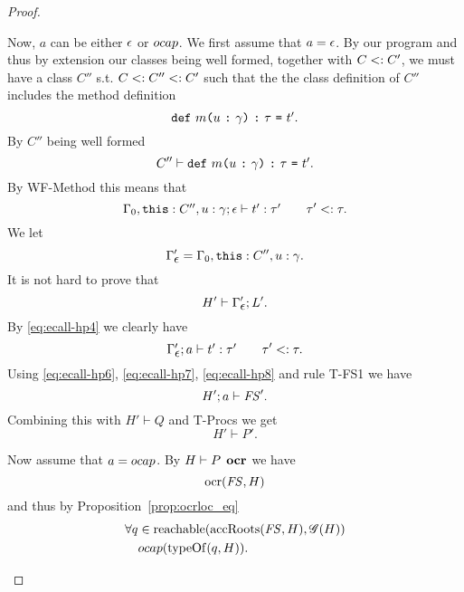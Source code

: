 \begin{proof}
\begin{description}
\begin{description}
          Now, $a$ can be either $\mbox{$\epsilon$}$ or $\mbox{$ocap$}$. We first assume that $a =
          \mbox{$\epsilon$}$.
          By our program and thus by extension our classes being well formed, together
          with $C <: C'$, we must have a class $C''$ s.t. $C <: C'' <:
          C'$ such that the the class definition of $C''$ includes the method
          definition
          \begin{equation*}
            \mbox{\mdseries\texttt{def}~$m$\texttt{(}$u$~\texttt{:}~$\gamma$\texttt{)}~\texttt{:}~$\tau$~\texttt{=}~$t'$}.
          \end{equation*}
          By $C''$ being well formed
          \begin{equation}
            C'' \vdash \mbox{\mdseries\texttt{def}~$m$\texttt{(}$u$~\texttt{:}~$\gamma$\texttt{)}~\texttt{:}~$\tau$~\texttt{=}~$t'$}.
          \end{equation}
          By {\sc WF-Method} this means that
          \begin{equation} \label{eq:ecall-hp4}
            \mbox{$\Gamma_0,\mbox{\mdseries\texttt{this}}: C'', u: \gamma;\mbox{$\epsilon$}\vdash t':\tau'$}
            \quad\quad \tau' <: \tau.
          \end{equation}
          We let
          \begin{equation}
            \Gamma_{\mbox{$\epsilon$}}' = \Gamma_0, \mbox{\mdseries\texttt{this}}: C'', u: \gamma.
          \end{equation}
          It is not hard to prove that 
          \begin{equation} \label{eq:ecall-hp7}
            H' \vdash \Gamma_{\mbox{$\epsilon$}}'; L'.
          \end{equation}
          By \eqref{eq:ecall-hp4} we clearly have
          \begin{equation} \label{eq:ecall-hp8}
            \mbox{$\Gamma_{\mbox{$\epsilon$}}';a\vdash t':\tau'$} \quad\quad \tau' <: \tau.
          \end{equation}
          Using  \eqref{eq:ecall-hp6}, \eqref{eq:ecall-hp7},
          \eqref{eq:ecall-hp8} and rule {\sc T-FS1} we have
          \begin{equation}
            H';a \vdash \mathit{FS}'.
          \end{equation}
          Combining this with $H' \vdash Q$ and {\sc T-Procs} we get
          \begin{equation}
            H' \vdash P'.
          \end{equation}

          Now assume that $a = \mbox{$ocap$}$. By $H \vdash P \:\: \mbox{\bf ocr}$ we have
          \begin{equation}
            \mbox{$\mathrm{ocr}$}(\mathit{FS}, H)
          \end{equation}
          and thus by Proposition~\ref{prop:ocrloc_eq}
          \begin{equation}
            \begin{aligned}
              \forall q &\in \mbox{$\mathrm{reachable}$}(\mbox{$\mathrm{accRoots}$}(\mathit{FS}, H), \mathscr{G}(H)) \\
              & \mbox{$ocap$}(\mbox{$\mathrm{typeOf}$}(q, H)).
            \end{aligned}
          \end{equation}
          

\end{description}
\end{description}
\end{proof}
